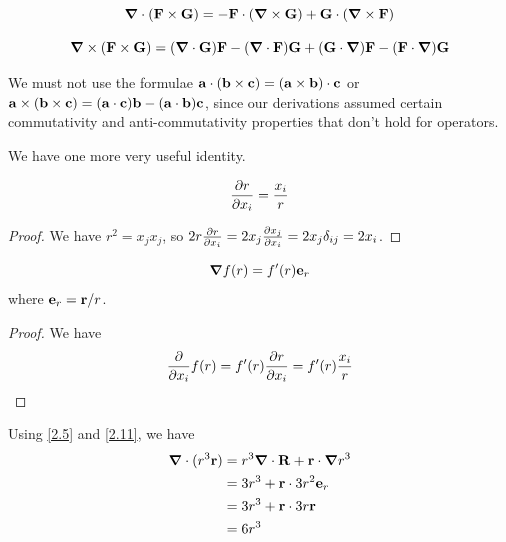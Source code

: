 \documentclass{../template/note}
\begin{document}
    \begin{proposition}
        \[
            \grad \cdot (\V F \times \V G) = -\V F \cdot (\grad \times \V G) + \V G \cdot (\grad \times \V F)
        \]
    \end{proposition}
    
    \begin{proposition}
        \[
            \grad \times (\V F \times \V G) = (\grad \cdot \V G) \V F - (\grad \cdot \V F)\V G + (\V G \cdot \grad)\V F - (\V F \cdot \grad)\V G
        \]
    \end{proposition}
    
    \begin{remark*}
        We must not use the formulae \(\V a \cdot (\V b \times \V c) = (\V a \times \V b) \cdot \V c\) or \(\V a \times (\V b \times \V c) = (\V a \cdot \V c) \V b - (\V a \cdot \V b)\V c\), since our derivations assumed certain commutativity and anti-commutativity properties that don't hold for operators.
    \end{remark*}
    
    We have one more very useful identity.

    \begin{proposition}
        \[
            \pd{r}{x_i} = \frac{x_i}{r}
        \]
    \end{proposition}
    
    \begin{proof}
        We have \(r^2 = x_jx_j\), so \(2r \pd{r}{x_i} = 2x_j \pd{x_j}{x_i} = 2x_j \delta_{ij} = 2x_i\).
    \end{proof}
    
    \begin{corollary}
        \label{2.11}\[
            \grad f(r) = f'(r) \V e_r
        \]
        where \(\V e_r = \V r / r\).
    \end{corollary}
    
    \begin{proof}
        We have
        \begin{align*}
            \pd{}{x_i} f(r) = f'(r) \pd{r}{x_i} = f'(r) \frac{x_i}{r}
        \end{align*}
    \end{proof}
    
    \begin{example*}
        Using \cref{2.5} and \cref{2.11}, we have
        \begin{align*}
            \grad \cdot (r^3 \V r) &= r^3 \grad \cdot \V R + \V r \cdot \grad r^3 \\
            &= 3r^3 + \V r \cdot 3r^2 \V e_r \\
            &= 3r^3 + \V r \cdot 3 r \V r \\
            &= 6r^3
        \end{align*}
    \end{example*}
    
\end{document}
